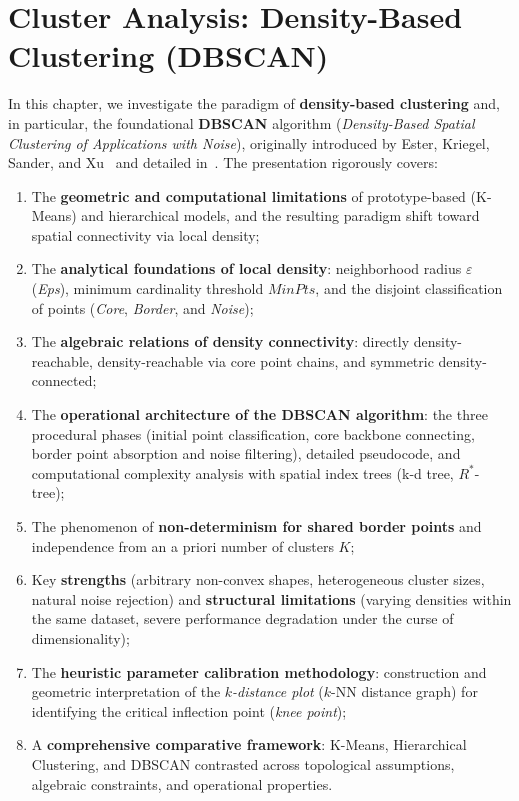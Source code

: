 \chapter{Cluster Analysis: Density-Based Clustering (DBSCAN)}
\label{chap:dm-density-dbscan}

In this chapter, we investigate the paradigm of \textbf{density-based clustering} and, in particular, the foundational \textbf{DBSCAN} algorithm (\textit{Density-Based Spatial Clustering of Applications with Noise}), originally introduced by Ester, Kriegel, Sander, and Xu~\cite{ester1996} and detailed in~\cite{tan2018}.
The presentation rigorously covers:
\begin{enumerate}[noitemsep]
    \item The \textbf{geometric and computational limitations} of prototype-based (K-Means) and hierarchical models, and the resulting paradigm shift toward spatial connectivity via local density;
    \item The \textbf{analytical foundations of local density}: neighborhood radius $\varepsilon$ (\textit{Eps}), minimum cardinality threshold $MinPts$, and the disjoint classification of points (\textit{Core}, \textit{Border}, and \textit{Noise});
    \item The \textbf{algebraic relations of density connectivity}: directly density-reachable, density-reachable via core point chains, and symmetric density-connected;
    \item The \textbf{operational architecture of the DBSCAN algorithm}: the three procedural phases (initial point classification, core backbone connecting, border point absorption and noise filtering), detailed pseudocode, and computational complexity analysis with spatial index trees (k-d tree, $R^*$-tree);
    \item The phenomenon of \textbf{non-determinism for shared border points} and independence from an a priori number of clusters $K$;
    \item Key \textbf{strengths} (arbitrary non-convex shapes, heterogeneous cluster sizes, natural noise rejection) and \textbf{structural limitations} (varying densities within the same dataset, severe performance degradation under the curse of dimensionality);
    \item The \textbf{heuristic parameter calibration methodology}: construction and geometric interpretation of the \textit{$k$-distance plot} ($k$-NN distance graph) for identifying the critical inflection point (\textit{knee point});
    \item A \textbf{comprehensive comparative framework}: K-Means, Hierarchical Clustering, and DBSCAN contrasted across topological assumptions, algebraic constraints, and operational properties.
\end{enumerate}

